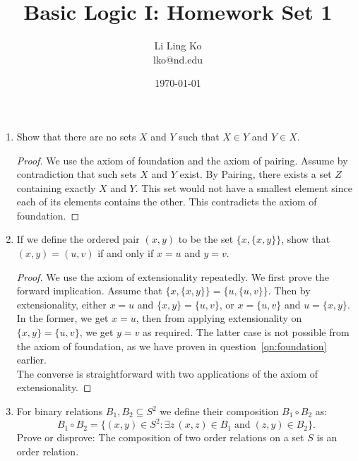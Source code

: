 \documentclass{article}
\begin{document}
\title{Basic Logic I: Homework Set 1}
\author{Li Ling Ko\\ lko@nd.edu}
\date{\today}
\maketitle

\begin{enumerate}
  \item Show that there are no sets $X$ and $Y$ such that $X\in Y$ and
    $Y\in X$. \label{qn:foundation}

    \begin{proof}
      We use the axiom of foundation and the axiom of pairing. Assume by
      contradiction that such sets $X$ and $Y$ exist. By Pairing, there
      exists a set $Z$ containing exactly $X$ and $Y$. This set would not
      have a smallest element since each of its elements contains the
      other. This contradicts the axiom of foundation.
    \end{proof}

  \item If we define the ordered pair $(x,y)$ to be the set $\{x,\{x,y\}\}$,
    show that $(x,y)=(u,v)$ if and only if $x=u$ and $y=v$.

    \begin{proof}
      We use the axiom of extensionality repeatedly. We first prove the
      forward implication. Assume that $\{x,\{x,y\}\}=\{u,\{u,v\}\}$. Then
      by extensionality, either $x=u$ and $\{x,y\}=\{u,v\}$, or $x=\{u,v\}$
      and $u=\{x,y\}$. In the former, we get $x=u$, then from applying
      extensionality on $\{x,y\}=\{u,v\}$, we get $y=v$ as required. The
      latter case is not possible from the axiom of foundation, as we have
      proven in question~\ref{qn:foundation} earlier. \\

      The converse is straightforward with two applications of the
      axiom of extensionality.
    \end{proof}

  \item For binary relations $B_1,B_2\subseteq S^2$ we define their
    composition $B_1\circ B_2$ as:
    \begin{equation*}
      B_1\circ B_2=\{(x,y)\in S^2: \exists z\, (x,z)\in B_1\;\text{and}\;
      (z,y)\in B_2\}.
    \end{equation*}
    Prove or disprove: The composition of two order relations on a set $S$
    is an order relation.


\end{enumerate}
\end{document}
